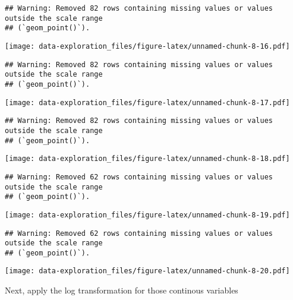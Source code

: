 \documentclass[
]{article}
\begin{document}
\begin{verbatim}
## Warning: Removed 82 rows containing missing values or values outside the scale range
## (`geom_point()`).
\end{verbatim}

\texttt{[image: data-exploration\_files/figure-latex/unnamed-chunk-8-16.pdf]}

\begin{verbatim}
## Warning: Removed 82 rows containing missing values or values outside the scale range
## (`geom_point()`).
\end{verbatim}

\texttt{[image: data-exploration\_files/figure-latex/unnamed-chunk-8-17.pdf]}

\begin{verbatim}
## Warning: Removed 82 rows containing missing values or values outside the scale range
## (`geom_point()`).
\end{verbatim}

\texttt{[image: data-exploration\_files/figure-latex/unnamed-chunk-8-18.pdf]}

\begin{verbatim}
## Warning: Removed 62 rows containing missing values or values outside the scale range
## (`geom_point()`).
\end{verbatim}

\texttt{[image: data-exploration\_files/figure-latex/unnamed-chunk-8-19.pdf]}

\begin{verbatim}
## Warning: Removed 62 rows containing missing values or values outside the scale range
## (`geom_point()`).
\end{verbatim}

\texttt{[image: data-exploration\_files/figure-latex/unnamed-chunk-8-20.pdf]}

Next, apply the log transformation for those continous variables
\end{document}
